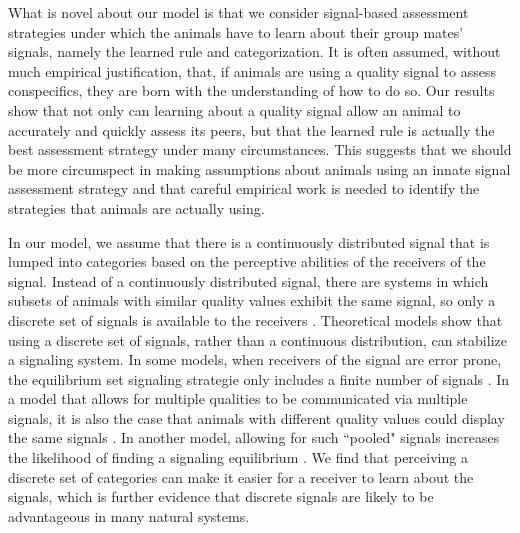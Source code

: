 What is novel about our model is that we consider signal-based assessment strategies under which the animals have to learn about their group mates' signals, namely the learned rule and categorization. It is often assumed, without much empirical justification, that, if animals are using a quality signal to assess conspecifics, they are born with the understanding of how to do so. Our results show that not only can learning about a quality signal allow an animal to accurately and quickly assess its peers, but that the learned rule is actually the best assessment strategy under many circumstances. This suggests that we should be more circumspect in making assumptions about animals using an innate signal assessment strategy and that careful empirical work is needed to identify the strategies that animals are actually using.

In our model, we assume that there is a continuously distributed signal that is lumped into categories based on the perceptive abilities of the receivers of the signal. Instead of a continuously distributed signal, there are systems in which subsets of animals with similar quality values exhibit the same signal, so only a discrete set of signals is available to the receivers \citep{Johnstone:1994uq}. Theoretical models show that using a discrete set of signals, rather than a continuous distribution, can stabilize a signaling system. In some models, when receivers of the signal are error prone, the equilibrium set  signaling strategie only includes a finite number of signals \citep{Grafen:1993kx,Johnstone:1994uq}. In a model that allows for multiple qualities to be communicated via multiple signals, it is also the case that animals with different quality values could display the same signals \citep{Johnstone:1995vn}. In another model, allowing for such ``pooled" signals increases the likelihood of finding a signaling equilibrium \citep{Lachmann:1998fk}. We find that perceiving a discrete set of categories can make it easier for a receiver to learn about the signals, which is further evidence that discrete signals are likely to be advantageous in many natural systems.

